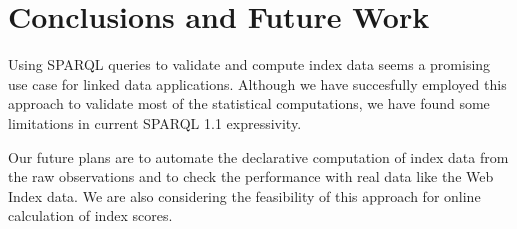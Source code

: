 \section{Conclusions and Future Work}

Using SPARQL queries to validate and compute index data seems a promising use
case for linked data applications. 
Although we have succesfully employed this approach to validate most of the
statistical computations, we have found some limitations in current SPARQL 1.1 
expressivity.

Our future plans are to automate the declarative computation of index data
 from the raw observations and to check the performance with real data like
 the Web Index data. We are also considering the feasibility of this approach 
 for online calculation of index scores. 


